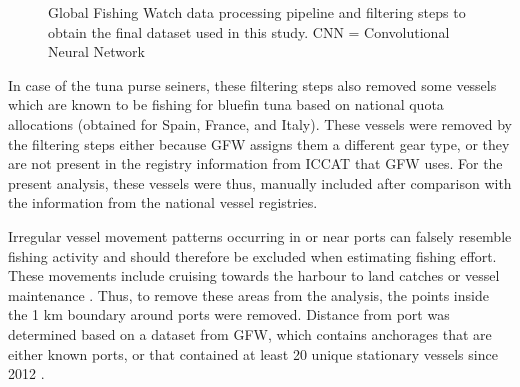 \begin{figure}[htp]
\begin{center}
        \end{center}        
\caption{Global Fishing Watch data processing pipeline and filtering steps to obtain the final dataset used in this study. CNN = Convolutional Neural Network}
\label{fig:workflow}
\end{figure}

\medskip

In case of the tuna purse seiners, these filtering steps also removed some vessels which are known to be fishing for bluefin tuna based on 
national quota allocations (obtained for Spain, France, and Italy). These vessels were
removed by the filtering steps either because GFW assigns them a different gear type, or they are not present in the
registry information from ICCAT that GFW uses. For the present analysis, these vessels were thus, manually included after comparison with the information from the national
vessel registries.

\medskip

Irregular vessel movement patterns occurring in or near ports can falsely resemble fishing activity and should therefore be excluded when estimating fishing effort. 
These movements include cruising towards the harbour to land catches or vessel maintenance \citep{souza}. Thus,
to remove these areas from the analysis, the points inside the 1 km boundary around ports were removed. Distance from port was determined based on a dataset from 
GFW, which contains anchorages that are either known ports, or that contained at least 20 unique stationary vessels since 2012 \citep{gfw_distance}. 


